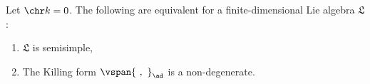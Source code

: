 Let $\chr k = 0$. The following are equivalent for a finite-dimensional
Lie algebra $\mathfrak{L}$:
\begin{enumerate}[label=(\arabic*)]
	\item $\mathfrak{L}$ is semisimple,
	\item The Killing form $\vspan{\ ,\ }_{\ad}$ is a non-degenerate.
\end{enumerate}

